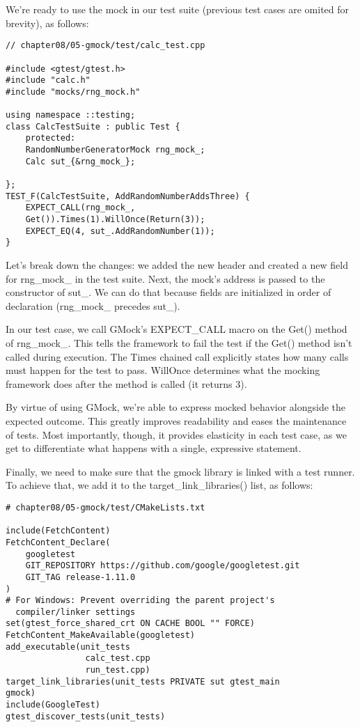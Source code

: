 We're ready to use the mock in our test suite (previous test cases are omited for brevity), as follows:

\begin{lstlisting}[style=styleCXX]
// chapter08/05-gmock/test/calc_test.cpp

#include <gtest/gtest.h>
#include "calc.h"
#include "mocks/rng_mock.h"

using namespace ::testing;
class CalcTestSuite : public Test {
	protected:
	RandomNumberGeneratorMock rng_mock_;
	Calc sut_{&rng_mock_};

};
TEST_F(CalcTestSuite, AddRandomNumberAddsThree) {
	EXPECT_CALL(rng_mock_,
	Get()).Times(1).WillOnce(Return(3));
	EXPECT_EQ(4, sut_.AddRandomNumber(1));
}
\end{lstlisting}

Let's break down the changes: we added the new header and created a new field for rng\_mock\_ in the test suite. Next, the mock's address is passed to the constructor of sut\_. We can do that because fields are initialized in order of declaration (rng\_mock\_ precedes sut\_).

In our test case, we call GMock's EXPECT\_CALL macro on the Get() method of rng\_mock\_. This tells the framework to fail the test if the Get() method isn't called during execution. The Times chained call explicitly states how many calls must happen for the test to pass. WillOnce determines what the mocking framework does after the method is called (it returns 3).

By virtue of using GMock, we're able to express mocked behavior alongside the expected outcome. This greatly improves readability and eases the maintenance of tests. Most importantly, though, it provides elasticity in each test case, as we get to differentiate what happens with a single, expressive statement.

Finally, we need to make sure that the gmock library is linked with a test runner. To achieve that, we add it to the target\_link\_libraries() list, as follows:

\begin{lstlisting}[style=styleCMake]
# chapter08/05-gmock/test/CMakeLists.txt

include(FetchContent)
FetchContent_Declare(
	googletest
	GIT_REPOSITORY https://github.com/google/googletest.git
	GIT_TAG release-1.11.0
)
# For Windows: Prevent overriding the parent project's
  compiler/linker settings
set(gtest_force_shared_crt ON CACHE BOOL "" FORCE)
FetchContent_MakeAvailable(googletest)
add_executable(unit_tests
				calc_test.cpp
				run_test.cpp)
target_link_libraries(unit_tests PRIVATE sut gtest_main
gmock)
include(GoogleTest)
gtest_discover_tests(unit_tests)
\end{lstlisting}

